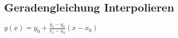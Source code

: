 


\begin{minipage}{13cm}
	
	
\end{minipage}
\begin{minipage}{5cm}
	
\end{minipage}
\begin{multicols}{2}
	
	\columnbreak
	
	
\end{multicols}
	
%	

\subsection{Geradengleichung Interpolieren}
$ y(x)=y_0 + \frac{y_1 - y_0}{x_1 - x_0}(x-x_0) $